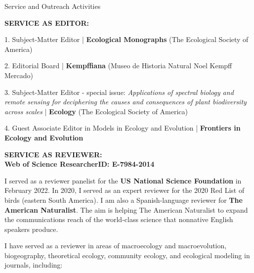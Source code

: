 \documentclass{resume} %
\begin{document}
\begin{rSection}{Service and Outreach Activities}

\textbf{SERVICE AS EDITOR:} %
\normalfont

\item 1. Subject-Matter Editor | {\bf Ecological Monographs} (The Ecological Society of America) 
\item 2. Editorial Board | {\bf Kempffiana} (Museo de Historia Natural Noel Kempff Mercado) 
\item 3. Subject-Matter Editor - special issue: {\em Applications of spectral biology and remote sensing for deciphering the causes and consequences of plant biodiversity across scales} | {\bf Ecology} (The Ecological Society of America)
\item 4. Guest Associate Editor in Models in Ecology and Evolution | {\bf Frontiers in Ecology and Evolution}

\textbf{SERVICE AS REVIEWER:} \smallskip \\ 
\textbf{Web of Science ResearcherID: E-7984-2014}

\normalfont

I served as a reviewer panelist for the {\bf US National Science Foundation} in February 2022. In 2020, I served as an expert reviewer for the 2020 Red List of birds (eastern South America). I am also a Spanish-language reviewer for {\bf The American Naturalist}. The aim is helping The American Naturalist to expand the communications reach of the world-class science that nonnative English speakers produce. 

I have served as a reviewer in areas of macroecology and macroevolution, biogeography, theoretical ecology, community ecology, and ecological modeling in journals, including: \smallskip 
\begin{multicols}{2}


\end{multicols}
\end{rSection}
\end{document}
